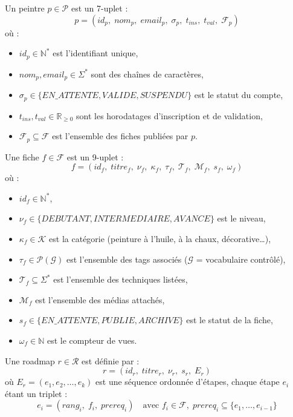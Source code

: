 \documentclass[12pt,a4paper]{report}
\begin{document}
\begin{definition}
Un peintre $p \in \mathcal{P}$ est un 7-uplet :
\[
p = (id_p,\; nom_p,\; email_p,\; \sigma_p,\; t_{ins},\; t_{val},\; \mathcal{F}_p)
\]
où :
\begin{itemize}
  \item $id_p \in \mathbb{N}^*$ est l'identifiant unique,
  \item $nom_p, email_p \in \Sigma^*$ sont des chaînes de caractères,
  \item $\sigma_p \in \{EN\_ATTENTE, VALIDE, SUSPENDU\}$ est le statut du compte,
  \item $t_{ins}, t_{val} \in \mathbb{R}_{\geq 0}$ sont les horodatages d'inscription et de validation,
  \item $\mathcal{F}_p \subseteq \mathcal{F}$ est l'ensemble des fiches publiées par $p$.
\end{itemize}
\end{definition}

\begin{definition}
Une fiche $f \in \mathcal{F}$ est un 9-uplet :
\[
f = (id_f,\; titre_f,\; \nu_f,\; \kappa_f,\; \tau_f,\; \mathcal{T}_f,\; \mathcal{M}_f,\; s_f,\; \omega_f)
\]
où :
\begin{itemize}
  \item $id_f \in \mathbb{N}^*$,
  \item $\nu_f \in \{DEBUTANT, INTERMEDIAIRE, AVANCE\}$ est le niveau,
  \item $\kappa_f \in \mathcal{K}$ est la catégorie (peinture à l'huile, à la chaux, décorative\ldots),
  \item $\tau_f \in \mathcal{P}(\mathcal{G})$ est l'ensemble des tags associés ($\mathcal{G}$ = vocabulaire contrôlé),
  \item $\mathcal{T}_f \subseteq \Sigma^*$ est l'ensemble des techniques listées,
  \item $\mathcal{M}_f$ est l'ensemble des médias attachés,
  \item $s_f \in \{EN\_ATTENTE, PUBLIE, ARCHIVE\}$ est le statut de la fiche,
  \item $\omega_f \in \mathbb{N}$ est le compteur de vues.
\end{itemize}
\end{definition}

\begin{definition}
Une roadmap $r \in \mathcal{R}$ est définie par :
\[
r = (id_r,\; titre_r,\; \nu_r,\; s_r,\; E_r)
\]
où $E_r = (e_1, e_2, \ldots, e_k)$ est une séquence ordonnée d'étapes, chaque étape $e_i$
étant un triplet :
\[
e_i = (rang_i,\; f_i,\; prereq_i) \quad \text{avec } f_i \in \mathcal{F},\; prereq_i \subseteq \{e_1, \ldots, e_{i-1}\}
\]
\end{definition}
\end{document}
